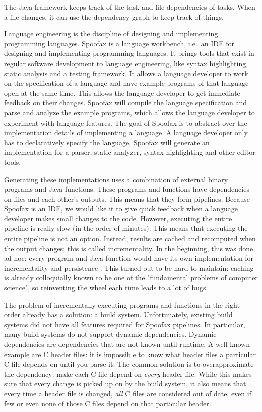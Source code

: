 The Java framework keeps track of the task and file dependencies of tasks.
When a file changes, it can use the dependency graph to keep track of things.




Language engineering is the discipline of designing and implementing programming languages.
Spoofax is a language workbench, i.e.\ an IDE for designing and implementing programming languages.
It brings tools that exist in regular software development to language engineering, like syntax highlighting, static analysis and a testing framework.
It allows a language developer to work on the specification of a language and have example programs of that language open at the same time.
This allows the language developer to get immediate feedback on their changes.
Spoofax will compile the language specification and parse and analyze the example programs, which allows the language developer to experiment with language features.
The goal of Spoofax is to abstract over the implementation details of implementing a language.
A language developer only has to declaratively specify the language, Spoofax will generate an implementation for a parser, static analyzer, syntax highlighting and other editor tools.

Generating these implementations uses a combination of external binary programs and Java functions.
These programs and functions have dependencies on files and each other's outputs.
This means that they form pipelines.
Because Spoofax is an IDE, we would like it to give quick feedback when a language developer makes small changes to the code.
However, executing the entire pipeline is really slow (in the order of minutes).
This means that executing the entire pipeline is not an option.
Instead, results are cached and recomputed when the output changes; this is called incrementality.
In the beginning, this was done ad-hoc: every program and Java function would have its own implementation for incrementality and persistence .
This turned out to be hard to maintain: caching is already colloquially known to be one of the "fundamental problems of computer science", so reinventing the wheel each time leads to a lot of bugs.

The problem of incrementally executing programs and functions in the right order already has a solution: a build system.
Unfortunately, existing build systems did not have all features required for Spoofax pipelines.
In particular, many build systems do not support dynamic dependencies.
Dynamic dependencies are dependencies that are not known until runtime.
A well known example are C header files: it is impossible to know what header files a particular C file depends on until you parse it.
The common solution is to overapproximate the dependency: make each C file depend on \emph{every} header file.
While this makes sure that every change is picked up on by the build system, it also means that every time a header file is changed, \emph{all} C files are considered out of date, even if few or even none of those C files depend on that particular header.


